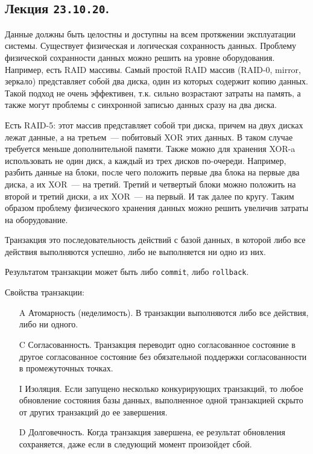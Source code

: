 \subsection{%
  Лекция \texttt{23.10.20}.%
}


Данные должны быть целостны и доступны на всем протяжении эксплуатации системы.
Существует физическая и логическая сохранность данных. Проблему физической
сохранности данных можно решить на уровне оборудования. Например, есть RAID
массивы. Самый простой RAID массив (RAID-0, mirror, зеркало) представляет собой
два диска, один из которых содержит копию данных. Такой подход не очень
эффективен, т.к. сильно возрастают затраты на память, а также могут проблемы с
синхронной записью данных сразу на два диска.

Есть RAID-5: этот массив представляет собой три диска, причем на двух
дисках лежат данные, а на третьем~--- побитовый XOR этих данных. В таком случае
требуется меньше дополнительной памяти. Также можно для хранения XOR-a
использовать не один диск, а каждый из трех дисков по-очереди. Например, разбить
данные на блоки, после чего положить первые два блока на первые два диска, а их
XOR~--- на третий. Третий и четвертый блоки можно положить на второй и третий
диски, а их XOR~--- на первый. И так далее по кругу. Таким образом проблему
физического хранения данных можно решить увеличив затраты на оборудование.

\begin{definition}
  Транзакция это последовательность действий с базой данных, в которой либо все
  действия выполняются успешно, либо не выполняется ни одно из них.

  Результатом транзакции может быть либо \texttt{commit}, либо
  \texttt{rollback}.
\end{definition}

Свойства транзакции:

\begin{enumerate}
\item[A]
  Атомарность (неделимость). В транзакции выполняются либо все действия, либо ни
  одного.

\item[C]
  Согласованность. Транзакция переводит одно согласованное состояние в другое
  согласованное состояние без обязательной поддержки согласованности в
  промежуточных точках.

\item[I]
  Изоляция. Если запущено несколько конкурирующих транзакций, то любое
  обновление состояния базы данных, выполненное одной транзакцией скрыто от
  других транзакций до ее завершения.

\item[D]
  Долговечность. Когда транзакция завершена, ее результат обновления
  сохраняется, даже если в следующий момент произойдет сбой.
\end{enumerate}

